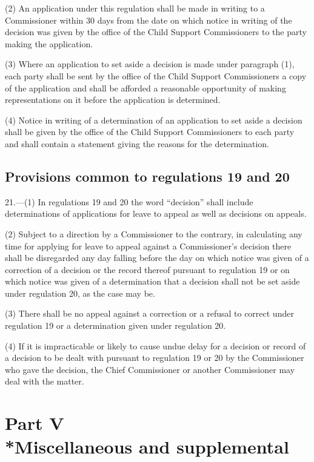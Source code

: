 \documentclass[12pt,a4paper]{article}
\begin{document}
(2) An application under this regulation shall be made in writing to a Commissioner within 30 days from the date on which notice in writing of the decision was given by the office of the Child Support Commissioners to the party making the application.

(3) Where an application to set aside a decision is made under paragraph (1), each party shall be sent by the office of the Child Support Commissioners a copy of the application and shall be afforded a reasonable opportunity of making representations on it before the application is determined.

(4) Notice in writing of a determination of an application to set aside a decision shall be given by the office of the Child Support Commissioners to each party and shall contain a statement giving the reasons for the determination.

\subsection[21. Provisions common to regulations 19 and 20]{Provisions common to regulations 19 and 20}

21.—(1) In regulations 19 and 20 the word “decision” shall include determinations of applications for leave to appeal as well as decisions on appeals.

(2) Subject to a direction by a Commissioner to the contrary, in calculating any time for applying for leave to appeal against a Commissioner’s decision there shall be disregarded any day falling before the day on which notice was given of a correction of a decision or the record thereof pursuant to regulation 19 or on which notice was given of a determination that a decision shall not be set aside under regulation 20, as the case may be.

(3) There shall be no appeal against a correction or a refusal to correct under regulation 19 or a determination given under regulation 20.

(4) If it is impracticable or likely to cause undue delay for a decision or record of a decision to be dealt with pursuant to regulation 19 or 20 by the Commissioner who gave the decision, the Chief Commissioner or another Commissioner may deal with the matter.

\section[Part V --- Miscellaneous and supplemental]{Part V\\*Miscellaneous and supplemental}
\end{document}
